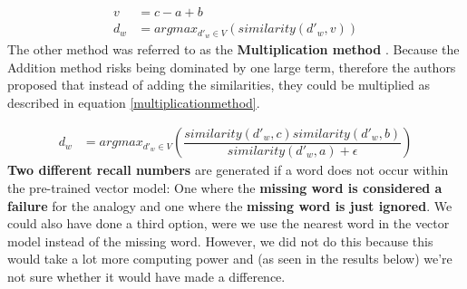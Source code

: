 \begin{equation}
\begin{split}
\label{additionmethod}
v &= c-a+b\\
d_w &= argmax_{d'_w \in V}(similarity(d'_w, v) )
\end{split}
\end{equation}
\newline
The other method was referred to as the \textbf{Multiplication method} \cite{leviandgoldberg}. Because the Addition method risks being dominated by one large term, therefore the authors proposed that instead of adding the similarities, they could be multiplied as described in equation \ref{multiplicationmethod}.

\begin{equation}
\begin{split}
\label{multiplicationmethod}
d_w &= argmax_{d'_w \in V}(\dfrac{similarity(d'_w, c) similarity(d'_w, b)}{similarity(d'_w, a) + \epsilon} )
\end{split}
\end{equation}
\newline
\textbf{Two different recall numbers} are generated if a word does not occur within the pre-trained vector model: One where the \textbf{missing word is considered a failure} for the analogy and one where the \textbf{missing word is just ignored}. We could also have done a third option, were we use the nearest word in the vector model instead of the missing word. However, we did not do this because this would take a lot more computing power and (as seen in the results below) we're not sure whether it would have made a difference.